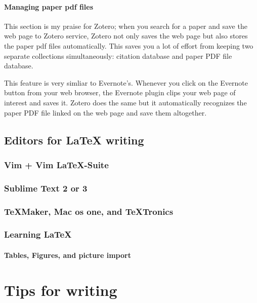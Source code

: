 \documentclass[11pt]{article}
\begin{document}
\paragraph{Managing paper pdf files}
This section is my praise for Zotero; when you search for a paper and
save the web page to Zotero service, Zotero not only saves the web page
but also stores the paper pdf files automatically. This saves you a lot
of effort from keeping two separate collections simultaneously: citation
database and paper PDF file database.

This feature is very simliar to Evernote's. Whenever you click on the Evernote
button from your web browser, the Evernote plugin clips your web page of
interest and saves it. Zotero does the same but it automatically recognizes
the paper PDF file linked on the web page and save them altogether.

\subsection{Editors for LaTeX writing}

\subsubsection{Vim + Vim LaTeX-Suite}

\subsubsection{Sublime Text 2 or 3}

\subsubsection{TeXMaker, Mac os one, and TeXTronics}

\subsubsection{Learning LaTeX}


\paragraph{Tables, Figures, and picture import}


\section{Tips for writing}
\end{document}
